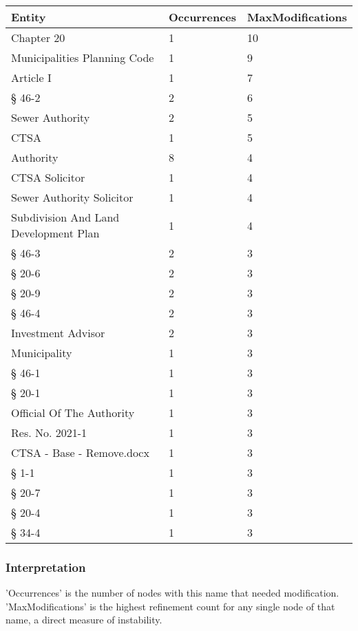 \begin{longtable}{p{} p{} p{}}
\toprule
\textbf{Entity} & \textbf{Occurrences} & \textbf{MaxModifications} \\
\midrule
\endfirsthead
\endhead
Chapter 20 & 1 & 10 \\
Municipalities Planning Code & 1 & 9 \\
Article I & 1 & 7 \\
§ 46-2 & 2 & 6 \\
Sewer Authority & 2 & 5 \\
CTSA & 1 & 5 \\
Authority & 8 & 4 \\
CTSA Solicitor & 1 & 4 \\
Sewer Authority Solicitor & 1 & 4 \\
Subdivision And Land Development Plan & 1 & 4 \\
§ 46-3 & 2 & 3 \\
§ 20-6 & 2 & 3 \\
§ 20-9 & 2 & 3 \\
§ 46-4 & 2 & 3 \\
Investment Advisor & 2 & 3 \\
Municipality & 1 & 3 \\
§ 46-1 & 1 & 3 \\
§ 20-1 & 1 & 3 \\
Official Of The Authority & 1 & 3 \\
Res. No. 2021-1 & 1 & 3 \\
CTSA - Base - Remove.docx & 1 & 3 \\
§ 1-1 & 1 & 3 \\
§ 20-7 & 1 & 3 \\
§ 20-4 & 1 & 3 \\
§ 34-4 & 1 & 3 \\
\bottomrule
\end{longtable}
\subsubsection*{Interpretation}
'Occurrences' is the number of nodes with this name that needed modification. 'MaxModifications' is the highest refinement count for any single node of that name, a direct measure of instability.
\clearpage